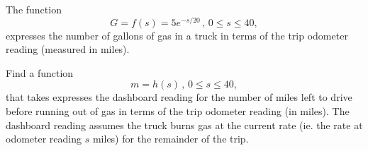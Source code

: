 \documentclass{ximera}
\begin{document}
\begin{question}  \label{Q45nbhbgnfgn}
The function
\[
       G = f(s) = 5 e^{-s/20} \, , \, 0\leq s \leq 40,
\]
expresses the number of gallons of gas in a truck in terms of the trip odometer reading (measured in miles).

Find a function
\[
          m = h(s) \, , \, 0\leq s \leq 40,
\]
that takes expresses the dashboard reading for the number of miles left to drive before running out of gas in terms of the trip odometer reading (in miles). The dashboard reading assumes the truck burns gas at the current rate (ie. the rate at odometer reading $s$ miles) for the remainder of the trip. 
\end{question}
\end{document}

